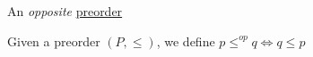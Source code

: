 An \emph{opposite} \href{doc/1 math/Seven Sketches in Compositionality/1 Generative Effects/3 Preorders/1 Preorder}{preorder}

Given a preorder $(P, \leq)$, we define $p \leq^{op} q \iff q \leq p$
